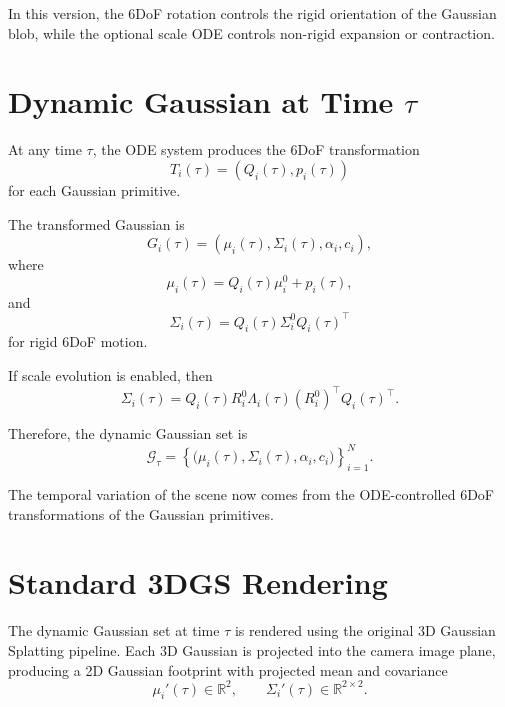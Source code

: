 \documentclass[11pt]{article}
\begin{document}
In this version, the 6DoF rotation controls the rigid orientation of the Gaussian blob, while the optional scale ODE controls non-rigid expansion or contraction.

\section{Dynamic Gaussian at Time $\tau$}

At any time $\tau$, the ODE system produces the 6DoF transformation
\begin{equation}
T_i(\tau) = \left( Q_i(\tau),p_i(\tau) \right)
\end{equation}
for each Gaussian primitive.

The transformed Gaussian is
\begin{equation}
G_i(\tau) = \left( \mu_i(\tau), \Sigma_i(\tau), \alpha_i, c_i \right),
\end{equation}
where
\begin{equation}
\mu_i(\tau) = Q_i(\tau)\mu_i^0+p_i(\tau),
\end{equation}
and
\begin{equation}
\Sigma_i(\tau) = Q_i(\tau)\Sigma_i^0Q_i(\tau)^\top
\end{equation}
for rigid 6DoF motion.

If scale evolution is enabled, then
\begin{equation}
\Sigma_i(\tau) = Q_i(\tau) R_i^0 \Lambda_i(\tau) (R_i^0)^\top Q_i(\tau)^\top.
\end{equation}

Therefore, the dynamic Gaussian set is
\begin{equation}
\mathcal{G}_{\tau} = \left\{ \bigl(\mu_i(\tau),\Sigma_i(\tau),\alpha_i,c_i\bigr) \right\}_{i=1}^N.
\end{equation}

The temporal variation of the scene now comes from the ODE-controlled 6DoF transformations of the Gaussian primitives.

\section{Standard 3DGS Rendering}

The dynamic Gaussian set at time $\tau$ is rendered using the original 3D Gaussian Splatting pipeline. Each 3D Gaussian is projected into the camera image plane, producing a 2D Gaussian footprint with projected mean and covariance
\begin{equation}
\mu_i'(\tau)\in\mathbb{R}^2,
\qquad
\Sigma_i'(\tau)\in\mathbb{R}^{2\times 2}.
\end{equation}
\end{document}
